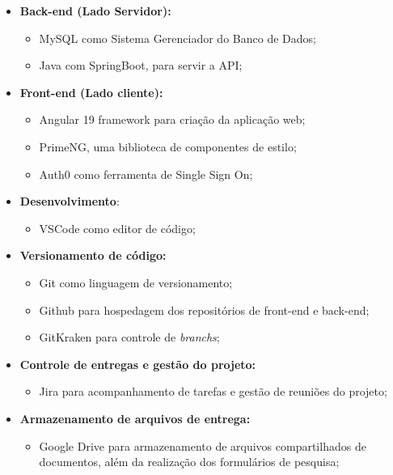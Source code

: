 \documentclass[
	article,			%
	12pt,				%
	oneside,			%
	a4paper,			%
    BIBLATEX,           %
	english,			%
	brazil,				%
	sumario=tradicional
	]{abntex2}
\begin{document}
\begin{itemize}
    \item \textbf{Back-end (Lado Servidor):}
        \begin{itemize}
            \item MySQL como Sistema Gerenciador do Banco de Dados;
            \item Java com SpringBoot, para servir a API;
        \end{itemize}
        
    \item \textbf{Front-end (Lado cliente):}
        \begin{itemize}
            \item Angular 19 framework para criação da aplicação web;
            \item PrimeNG, uma biblioteca de componentes de estilo;
            \item Auth0 como ferramenta de Single Sign On;
        \end{itemize}

    \item \textbf{Desenvolvimento}:
        \begin{itemize}
            \item VSCode como editor de código;
        \end{itemize}

    \item \textbf{Versionamento de código: }
        \begin{itemize}
            \item Git como linguagem de versionamento;
            \item Github para hospedagem dos repositórios de front-end e back-end;
            \item GitKraken para controle de \textit{branchs};
        \end{itemize}
        
    \item \textbf{Controle de entregas e gestão do projeto: }
        \begin{itemize}
            \item Jira para acompanhamento de tarefas e gestão de reuniões do projeto;
        \end{itemize}
        
    \item \textbf{Armazenamento de arquivos de entrega:}
        \begin{itemize}
            \item Google Drive para armazenamento de arquivos compartilhados de documentos, além da realização dos formulários de pesquisa;
        \end{itemize}

\end{itemize}
	
\end{document}
